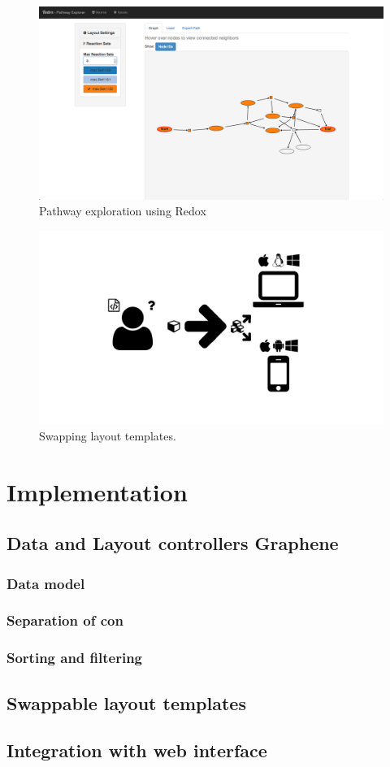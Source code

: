 \begin{figure}
  \centering
\end{figure}

\begin{figure}
  \centering
  \includegraphics[width=\textwidth,natwidth=610,natheight=642]{images/redox-ui.png}
  \caption{Pathway exploration using Redox}
  \label{Figure:redox}
\end{figure}


\begin{figure}
  \centering
  \includegraphics[width=\textwidth,page=7]{images/Figures.pdf}
  \caption{Swapping layout templates.}
  \label{Figure:redoxLayouts}
\end{figure}


\section{Implementation}
\subsection{Data and Layout controllers Graphene}
\subsubsection{Data model}
\subsubsection{Separation of con}
\subsubsection{Sorting and filtering}
\subsection{Swappable layout templates}
\subsection{Integration with web interface}
